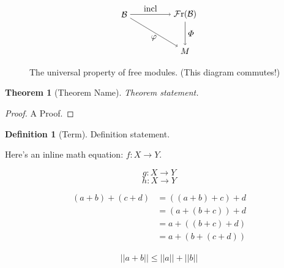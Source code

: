 \documentclass[11pt, reqno]{amsart}
\theoremstyle{plain}
\newtheorem{thm}{Theorem}[section]
\theoremstyle{definition}
\newtheorem*{defn}{Definition}
\theoremstyle{example}
\def\Fr{\mathcal{F}\mathrm{r}}
\begin{document}
\begin{figure}[htbp]
	\centering 
	$$\begin{tikzpicture}
		\node (B)   at (-1.25, 0)   {$\cB$};
		\node (FrB) at (1.25, 0)    {$\Fr(\cB)$};
		\node (M)   at (1.25, -1.5) {$M$};
			
		\draw[->] (B)   -- node[above] {incl}      (FrB);
		\draw[->] (FrB) -- node[right] {$\varPhi$} (M);
		\draw[->] (B)   -- node[below] {$\varphi$} (M);
	\end{tikzpicture}$$ 
	\caption{The universal property of free modules. (This diagram commutes!)}
\end{figure}


\begin{thm}[Theorem Name]
	Theorem statement.
\end{thm}

\begin{proof}
	A Proof.
\end{proof}

\begin{defn}[Term]
	Definition statement.
\end{defn}



Here's an inline math equation: $f: X \rightarrow Y$. 

$$g: X \rightarrow Y$$
\[h: X \rightarrow Y\]

\begin{align*}
  (a + b) + (c + d) &= ((a + b) + c) + d \\
  &= (a + (b + c)) + d \\ 
  &= a + ((b + c) + d) \\ 
  &= a + (b + (c + d)) 
\end{align*}

\begin{align}
	||a+b|| \leq ||a|| + ||b||
\end{align}
\end{document}
